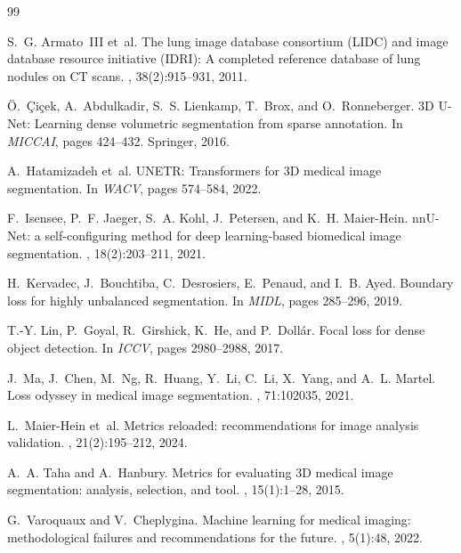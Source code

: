 \documentclass[10pt, a4paper, twocolumn]{article}
\begin{document}
\begin{thebibliography}{99}

S.~G. Armato~III et~al.
\newblock The lung image database consortium (LIDC) and image database resource initiative (IDRI): A completed reference database of lung nodules on CT scans.
, 38(2):915--931, 2011.

{\"O}.~\c{C}i\c{c}ek, A.~Abdulkadir, S.~S. Lienkamp, T.~Brox, and O.~Ronneberger.
\newblock 3D U-Net: Learning dense volumetric segmentation from sparse annotation.
\newblock In {\em MICCAI}, pages 424--432. Springer, 2016.

A.~Hatamizadeh et~al.
\newblock UNETR: Transformers for 3D medical image segmentation.
\newblock In {\em WACV}, pages 574--584, 2022.

F.~Isensee, P.~F. Jaeger, S.~A. Kohl, J.~Petersen, and K.~H. Maier-Hein.
\newblock nnU-Net: a self-configuring method for deep learning-based biomedical image segmentation.
, 18(2):203--211, 2021.

H.~Kervadec, J.~Bouchtiba, C.~Desrosiers, E.~Penaud, and I.~B. Ayed.
\newblock Boundary loss for highly unbalanced segmentation.
\newblock In {\em MIDL}, pages 285--296, 2019.

T.-Y. Lin, P.~Goyal, R.~Girshick, K.~He, and P.~Doll{\'a}r.
\newblock Focal loss for dense object detection.
\newblock In {\em ICCV}, pages 2980--2988, 2017.

J.~Ma, J.~Chen, M.~Ng, R.~Huang, Y.~Li, C.~Li, X.~Yang, and A.~L. Martel.
\newblock Loss odyssey in medical image segmentation.
, 71:102035, 2021.

L.~Maier-Hein et~al.
\newblock Metrics reloaded: recommendations for image analysis validation.
, 21(2):195--212, 2024.

A.~A. Taha and A.~Hanbury.
\newblock Metrics for evaluating 3D medical image segmentation: analysis, selection, and tool.
, 15(1):1--28, 2015.

G.~Varoquaux and V.~Cheplygina.
\newblock Machine learning for medical imaging: methodological failures and recommendations for the future.
, 5(1):48, 2022.

\end{thebibliography}
\end{document}
